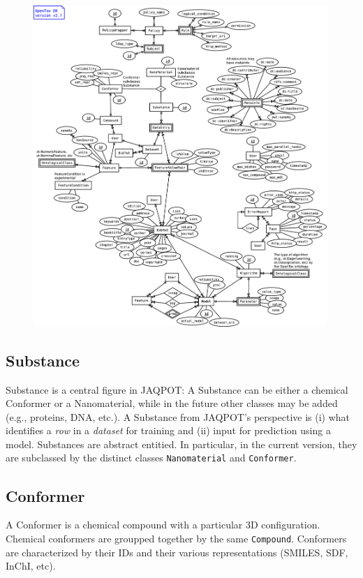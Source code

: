 \begin{figure}
 \centering
 \includegraphics[keepaspectratio=true,width=0.99\textwidth]{figures/er}
\end{figure}

\subsection{Substance}
Substance is a central figure in JAQPOT: A Substance can be either a
chemical Conformer or a Nanomaterial, while in the future other classes
may be added (e.g., proteins, DNA, etc.). A Substance from JAQPOT's
perspective is (i) what identifies a \textit{row} in a \textit{dataset} for
training and (ii) input for prediction using a model.
Substances are abstract entitied. In particular, in the current version, they
are subclassed by the distinct classes \texttt{Nanomaterial} and \texttt{Conformer}.

\subsection{Conformer}
A Conformer is a chemical compound with a particular 3D configuration.
Chemical conformers are groupped together by the same \texttt{Compound}.
Conformers are characterized by their IDs and their various representations
(SMILES, SDF, InChI, etc).

